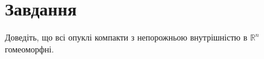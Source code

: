 
\chapter{Завдання \theHchapter}

\begin{tcolorbox}[title=Завдання]
    Доведіть, що всі опуклі компакти з непорожньою
    внутрішністю в $\mathbb{R}^{n}$ гомеоморфні.


\end{tcolorbox}




